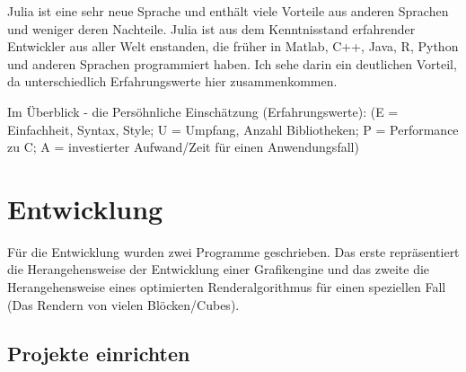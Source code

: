 \documentclass[11pt]{article}
\begin{document}
Julia ist eine sehr neue Sprache und enthält viele Vorteile aus anderen Sprachen und weniger deren Nachteile. Julia ist aus dem Kenntnisstand erfahrender Entwickler aus aller Welt enstanden, die früher in Matlab, C++, Java, R, Python und anderen Sprachen programmiert haben. Ich sehe darin ein deutlichen Vorteil, da unterschiedlich Erfahrungswerte hier zusammenkommen.\\

\noindent\begin{minipage}{\textwidth}
Im Überblick - die Persöhnliche Einschätzung (Erfahrungswerte): (E = Einfachheit, Syntax, Style; U = Umpfang, Anzahl Bibliotheken; P = Performance zu C; A = investierter Aufwand/Zeit für einen Anwendungsfall)\\

\skills
{
}
\end{minipage}

\section{Entwicklung}
Für die Entwicklung wurden zwei Programme geschrieben. Das erste repräsentiert die Herangehensweise der Entwicklung einer Grafikengine und das zweite die Herangehensweise eines optimierten Renderalgorithmus für einen speziellen Fall (Das Rendern von vielen Blöcken/Cubes).

\subsection{Projekte einrichten}
\end{document}
